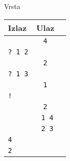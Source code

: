 \begin{statement}[
  problempoints=100,
  timelimit=1 sekunda,
  memorylimit=512 MiB,
]{Vrsta}
{\renewcommand{\arraystretch}{1.4}
  \setlength{\tabcolsep}{6pt}
  \begin{tabular}{lcl}
    Izlaz & Ulaz\\ \midrule
    \texttt{} & \texttt{4} \\
    \texttt{\frenchspacing? 1 2} & \texttt{}  \\
    \texttt{ } & \texttt{2} \\
    \texttt{\frenchspacing? 1 3} & \texttt{} \\
    \texttt{ } & \texttt{1} \\
    \texttt{\frenchspacing!} &\\
    \texttt{} & \texttt{2} \\
    \texttt{} & \texttt{\;\;\;\,1 4} \\
    \texttt{} & \texttt{\;\;\;\,2 3} \\
    \texttt{4} & \texttt{} \\
    \texttt{2} & \texttt{} \\
\end{tabular}}


\end{statement}

